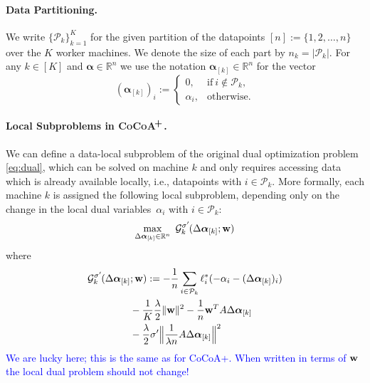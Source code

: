\documentclass{article}
\newcommand{\cocoap}{\textsc{CoCoA$\!^{\bf \textbf{\footnotesize+}}$}\xspace}
\newcommand{\eqdef}{:=}
\newcommand{\R}{\mathbb{R}}                      %
\newcommand{\wv}{ {\bf w}}
\newcommand{\alphav}{ {\boldsymbol \alpha}}
\newcommand{\0}{ {\bf 0}}
\newcommand{\vsubset}[2]{#1_{[#2]}}
\newcommand{\Ggk}{\mathcal{G}^{\sigma'}_k\hspace{-0.08em}}
\theoremstyle{plain}
\theoremstyle{definition}
\begin{document}
%
\paragraph{Data Partitioning.}

We write $\{\mathcal{P}_k
\}_{k=1}^K$ for the %
given partition of the datapoints $[n]\eqdef \{1,2,\dots,n\}$ over the $K$ worker machines.
We denote the size of each part by $n_k=|\mathcal{P}_k|$.
For any $k\in[K]$
and $\alphav\in \R^n$
we use the notation
$\vsubset{\alphav}{k}\in \R^n$ for the vector\vspace{-3mm}
$$
(\vsubset{\alphav}{k})_i
 :=
 \begin{cases}
 0,&\mbox{if}\ i\notin \mathcal{P}_k,\\
 \alpha_i,&\mbox{otherwise.}
\end{cases}
$$

\paragraph{Local Subproblems in \cocoap.}

We can define a data-local subproblem of the original dual optimization problem \eqref{eq:dual}, which can be solved on machine $k$ and only requires accessing data which is already available locally, i.e., datapoints with $i\in\mathcal{P}_k$. More formally, each machine $k$ is assigned the following local subproblem, depending only on the change in the local dual variables~$\alpha_i$ with $i\in\mathcal{P}_k$:
\begin{equation} 
\max_{\vsubset{\Delta \alphav}{k}\in\R^{n}} \ %
\Ggk(  \vsubset{\Delta \alphav}{k}; \wv)
\end{equation} 
where
\begin{align} 
&\Ggk(  \vsubset{\Delta \alphav}{k}; \wv)
\eqdef
-\frac1n\sum_{i \in \mathcal{P}_k} 
\ell_i^*(-\alpha_i - (\vsubset{\Delta \alphav}{k})_i)
\nonumber
\\
&\hspace{15mm} 
- \frac1K 
\frac{\lambda}{2}
\|\wv\|^2
-\frac1n
\wv^T A \vsubset{\Delta \alphav}{k}
\nonumber
\\
&\hspace{15mm}  
- \frac\lambda2
 \sigma'  \Big\|\frac1{\lambda n} A \vsubset{\Delta \alphav}{k}\Big\|^2
 \label{eq:subproblem}
\end{align}
\textcolor{blue}{We are lucky here; this is the same as for CoCoA+.
When written in terms of $\wv$ the local dual problem should not change!}
\end{document}
